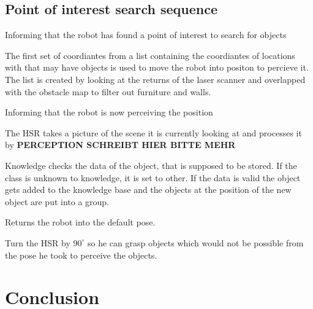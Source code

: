 \documentclass[main.tex]{subfiles}
\begin{document}
	\subsection{Point of interest search sequence}
    Informing that the robot has found a point of interest to search for objects
    
    The first set of coordiantes from a list containing the coordiantes of locations with that may have objects is used to move the robot into positon to percieve it. 
    The list is created by looking at the returns of the laser scanner and overlapped with the obstacle map to filter out furniture and walls. 
    
    Informing that the robot is now perceiving the position
      
    The HSR takes a picture of the scene it is currently looking at and processes it by \textbf{PERCEPTION SCHREIBT HIER BITTE MEHR}
    
    Knowledge checks the data of the object, that is supposed to be stored. If the class is unknown to knowledge, it is set to other. If the data is valid the object gets added to the knowledge base and the objects at the position of the new object are put into a group.
    
   	Returns the robot into the default pose.

    Turn the HSR by $90^\circ$ so he can grasp objects which would not be possible from     the pose he took to perceive the objects.
	\section{Conclusion}
		
		
	\endgroup
\end{document}
